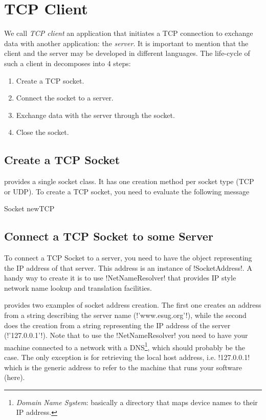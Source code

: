 \documentclass[a4paper,10pt,twoside]{book}
\begin{document}
\section{TCP Client}
\label{sec:clientTcpSocket}
We call \textit{TCP client}  an application that initiates a TCP connection to exchange data with another application: the \textit{server}.
It is important to mention that the client and the server may be developed in different languages.
The life-cycle of such a client in \pharo decomposes into 4 steps:
\begin{enumerate}
\item Create a TCP socket.
\item Connect the socket to a server.
\item Exchange data with the server through the socket.
\item Close the socket.
\end{enumerate}

\subsection{Create a TCP Socket}
\pharo provides a single socket class.
It has one creation method per socket type (TCP or UDP).
To create a TCP socket, you need to evaluate the following message 
\begin{code}{}
Socket newTCP
\end{code}

\subsection{Connect a TCP Socket to some Server}
To connect a TCP Socket to a server, you need to have the object representing the IP address of that server. This address is an instance of \ct!SocketAddress!.
A handy way to create it is to use \ct!NetNameResolver! that  provides IP style network name lookup and translation facilities.

 provides two examples of socket address creation.
The first one creates an address from a string describing the server name (\ct!'www.esug.org'!), while the second does the creation from a string representing the  IP address of the server (\ct!'127.0.0.1'!).
Note that to use the \ct!NetNameResolver! you need to have your machine connected to a network with a DNS\footnote{\emph{Domain Name System}: basically a directory that maps device names to their IP address.}, which should probably be the case.
The only exception is for retrieving the local host address, i.e. \ct!127.0.0.1! which is the generic address to refer to the machine that runs your software (\pharo here).
\end{document}
